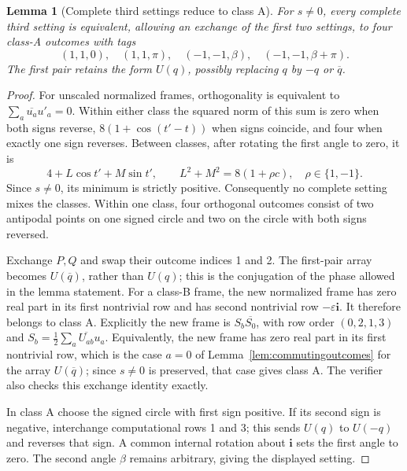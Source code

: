 \documentclass[11pt]{article}
\newtheorem{lemma}[theorem]{Lemma}
\begin{document}
\begin{lemma}[Complete third settings reduce to class A]
\label{lem:commutingcompletion}
For $s\ne0$, every complete third setting is equivalent, allowing an
exchange of the first two settings, to four class-A outcomes with tags
\[
 (1,1,0),\quad(1,1,\pi),\quad(-1,-1,\beta),\quad(-1,-1,\beta+\pi).
\]
The first pair retains the form $U(q)$, possibly replacing $q$ by
$-q$ or $\overline q$.
\end{lemma}
\begin{proof}
For unscaled normalized frames, orthogonality is equivalent to
$\sum_a\overline{u_a}u'_a=0$.
Within either class the squared norm of this sum is zero when both
signs reverse, $8(1+\cos(t'-t))$ when signs coincide, and four when
exactly one sign reverses. Between classes, after rotating the first
angle to zero, it is
\[
 4+L\cos t'+M\sin t',\qquad
 L^2+M^2=8(1+\rho c),\quad \rho\in\{1,-1\}.
\]
Since $s\ne0$, its minimum is strictly positive. Consequently no
complete setting mixes the classes. Within one class, four orthogonal
outcomes consist of two antipodal points on one signed circle and two
on the circle with both signs reversed.

Exchange $P,Q$ and swap their outcome indices 1 and 2. The first-pair
array becomes $U(\overline q)$, rather than $U(q)$; this is the
conjugation of the phase allowed in the lemma statement. For a class-B frame, the new normalized
frame has zero real part in its first nontrivial row and has second
nontrivial row $-\varepsilon\mathbf i$. It therefore belongs to class A.
Explicitly the new frame is $S_b\overline{S_0}$, with row order
$(0,2,1,3)$ and $S_b=\frac12\sum_a\overline{U_{ab}}u_a$.
Equivalently, the new frame has zero real part in its first nontrivial
row, which is the case $a=0$ of Lemma~\ref{lem:commutingoutcomes} for the
array $U(\overline q)$; since $s\neq0$ is preserved, that case gives
class A. The verifier also checks this exchange identity exactly.

In class A choose the signed circle with first sign positive.
If its second sign is negative, interchange computational rows 1 and 3;
this sends $U(q)$ to $U(-q)$ and reverses that sign.
A common internal rotation about $\mathbf i$ sets the first angle to zero.
The second angle $\beta$ remains arbitrary, giving the displayed setting.
\end{proof}
\end{document}
